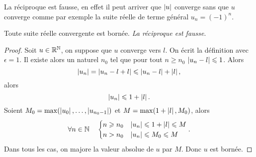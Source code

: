 La réciproque est fausse, en effet il peut arriver que $\left\lvert u\right\rvert$ converge sans que $u$ converge comme par exemple la suite réelle de terme général $u_n=(-1)^n$.
\begin{prop}
  Toute suite réelle convergente est bornée. \emph{La réciproque est fausse}.
\end{prop}
\begin{proof}
  Soit $u\in \mathbb{R}^{\mathbb{N}}$, on suppose que $u$ converge vers $l$. On écrit la définition avec $\epsilon=1$. Il existe alors un naturel $n_0$ tel que pour tout $n\geqslant n_0$ $\left\lvert u_n-l\right\rvert\leqslant 1$. Alors
  \begin{equation}
    \left\lvert u_n\right\rvert=\left\lvert u_n-l+l\right\rvert\leqslant \left\lvert u_n-l\right\rvert+\left\lvert l\right\rvert,
  \end{equation}
  alors
  \begin{equation}
    \left\lvert u_n\right\rvert\leqslant 1+\left\lvert l\right\rvert.
  \end{equation}
  Soient $M_0=\max(\left\lvert u_0\right\rvert,\ldots,\left\lvert u_{n_0-1}\right\rvert)$ et $M=\max(1+\left\lvert l\right\rvert,M_0)$, alors
  \begin{equation}
    \forall n \in \mathbb{N} \quad
    \begin{cases}
      n \geqslant n_0 & \left\lvert u_n\right\rvert\leqslant 1+\left\lvert l\right\rvert\leqslant M \\
      n>n_0 & \left\lvert u_n\right\rvert\leqslant M_0\leqslant M
    \end{cases}.
  \end{equation}
  Dans tous les cas, on majore la valeur absolue de $u$ par $M$. Donc $u$ est bornée.
\end{proof}

